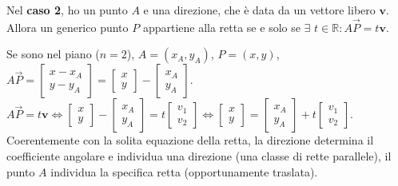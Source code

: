 \documentclass{article}
\begin{document}
Nel \textbf{caso 2}, ho un punto $A$ e una direzione, che \`{e} data da un
vettore libero $\mathbf{v}$. Allora un generico punto $P$ appartiene alla
retta se e solo se $\exists $ $t\in 
\mathbb{R}
:A\vec{P}=t\mathbf{v}$.

Se sono nel piano ($n=2$), $A=\left( x_{A},y_{A}\right) $, $P=\left(
x,y\right) $, $A\vec{P}=\left[ 
\begin{array}{c}
x-x_{A} \\ 
y-y_{A}%
\end{array}%
\right] =\left[ 
\begin{array}{c}
x \\ 
y%
\end{array}%
\right] -\left[ 
\begin{array}{c}
x_{A} \\ 
y_{A}%
\end{array}%
\right] $. $A\vec{P}=t\mathbf{v\Longleftrightarrow }\left[ 
\begin{array}{c}
x \\ 
y%
\end{array}%
\right] -\left[ 
\begin{array}{c}
x_{A} \\ 
y_{A}%
\end{array}%
\right] =t\left[ 
\begin{array}{c}
v_{1} \\ 
v_{2}%
\end{array}%
\right] \Longleftrightarrow \left[ 
\begin{array}{c}
x \\ 
y%
\end{array}%
\right] =\left[ 
\begin{array}{c}
x_{A} \\ 
y_{A}%
\end{array}%
\right] +t\left[ 
\begin{array}{c}
v_{1} \\ 
v_{2}%
\end{array}%
\right] $. Coerentemente con la solita equazione della retta, la direzione
determina il coefficiente angolare e individua una direzione (una classe di
rette parallele), il punto $A$ individua la specifica retta (opportunamente
traslata).
\end{document}
